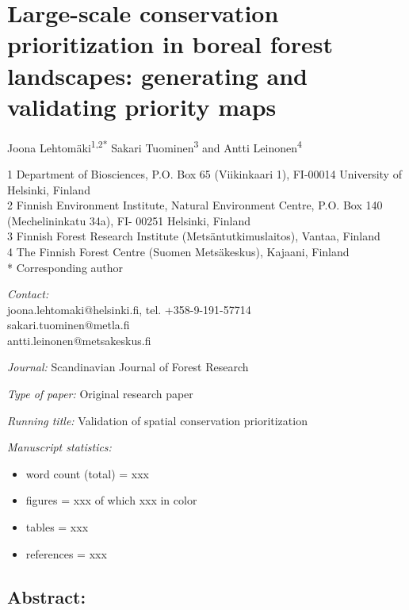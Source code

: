 \documentclass[]{article}
\begin{document}
\section{Large-scale conservation prioritization in boreal forest
landscapes: generating and validating priority maps}

Joona Lehtomäki\textsuperscript{1,2*} Sakari Tuominen\textsuperscript{3}
and Antti Leinonen\textsuperscript{4}

1 Department of Biosciences, P.O. Box 65 (Viikinkaari 1), FI-00014
University of Helsinki, Finland\\2 Finnish Environment Institute,
Natural Environment Centre, P.O. Box 140 (Mechelininkatu 34a), FI- 00251
Helsinki, Finland\\3 Finnish Forest Research Institute
(Metsäntutkimuslaitos), Vantaa, Finland\\4 The Finnish Forest Centre
(Suomen Metsäkeskus), Kajaani, Finland\\* Corresponding author

\emph{Contact:}\\joona.lehtomaki@helsinki.fi, tel.
+358-9-191-57714\\sakari.tuominen@metla.fi\\antti.leinonen@metsakeskus.fi

\emph{Journal:} Scandinavian Journal of Forest Research

\emph{Type of paper:} Original research paper

\emph{Running title:} Validation of spatial conservation prioritization

\emph{Manuscript statistics:}

\begin{itemize}
\itemsep1pt\parskip0pt
\item
  word count (total) = xxx
\item
  figures = xxx of which xxx in color
\item
  tables = xxx
\item
  references = xxx
\end{itemize}

\subsection{Abstract:}
\end{document}

